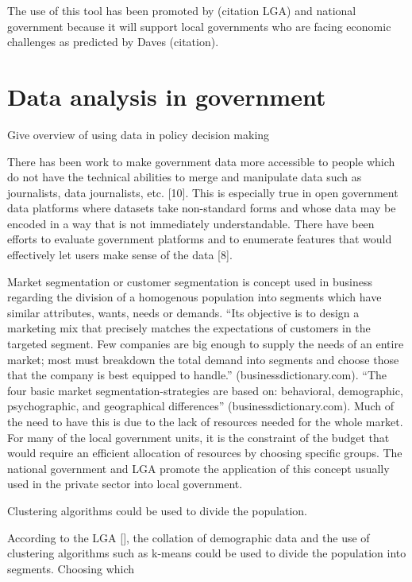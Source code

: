 The use of this tool has been promoted by (citation LGA) and national government because it will support local governments who are facing economic challenges as predicted by Daves (citation). \par


\section{Data analysis in government}
Give overview of using data in policy decision making\par
 
There has been work to make government data more accessible to people which do not have the technical abilities to merge and manipulate data such as journalists, data journalists, etc. [10]. This is especially true in open government data platforms where datasets take non-standard forms and whose data may be encoded in a way that is not immediately understandable. There have been efforts to evaluate government platforms and to enumerate features that would effectively let users make sense of the data [8].


Market segmentation or customer segmentation is concept used in business regarding the division of a homogenous population into segments which have similar attributes, wants, needs or demands. “Its objective is to design a marketing mix that precisely matches the expectations of customers in the targeted segment. Few companies are big enough to supply the needs of an entire market; most must breakdown the total demand into segments and choose those that the company is best equipped to handle.” (businessdictionary.com). “The four basic market segmentation-strategies are based on: behavioral, demographic, psychographic, and geographical differences” (businessdictionary.com). Much of the need to have this is due to the lack of resources needed for the whole market. For many of the local government units, it is the constraint of the budget that would require an efficient allocation of resources by choosing specific groups. The national government and LGA promote the application of this concept usually used in the private sector into local government.\par
 
Clustering algorithms could be used to divide the population.\par
 
According to the LGA [], the collation of demographic data and the use of clustering algorithms such as k-means could be used to divide the population into segments. Choosing which \par


